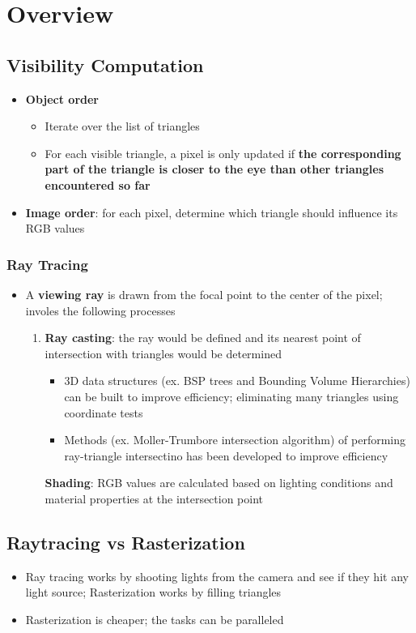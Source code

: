\chapter{Overview}

\section{Visibility Computation}

  \begin{itemize}
    \item \textbf{Object order}
    \begin{itemize}
      \item Iterate over the list of triangles
      \item For each visible triangle, a pixel is only updated if \textbf{
      the corresponding part of the triangle is closer to the eye than
      other triangles encountered so far}
    \end{itemize}
    \item \textbf{Image order}: for each pixel, determine which triangle should
    influence its RGB values
  \end{itemize}

  \subsection{Ray Tracing}

    \begin{itemize}
      \item A \textbf{viewing ray} is drawn from the focal point to the center
      of the pixel; involes the following processes
      \begin{enumerate}
        \item \textbf{Ray casting}: the ray would be defined and its nearest
        point of intersection with triangles would be determined
        \begin{itemize}
          \item 3D data structures (ex. BSP trees and
          Bounding Volume Hierarchies) can be built to improve efficiency;
          eliminating many triangles using coordinate tests
          \item Methods (ex. Moller-Trumbore intersection algorithm) of performing ray-triangle intersectino has been
          developed to improve efficiency
        \end{itemize}
        \textbf{Shading}: RGB values are calculated based on lighting
        conditions and material properties at the intersection point
      \end{enumerate}
    \end{itemize}

\section{Raytracing vs Rasterization}

  \begin{itemize}
    \item Ray tracing works by shooting lights from the camera and see if they
    hit any light source; Rasterization works by filling triangles
    \item Rasterization is cheaper; the tasks can be paralleled
  \end{itemize}
